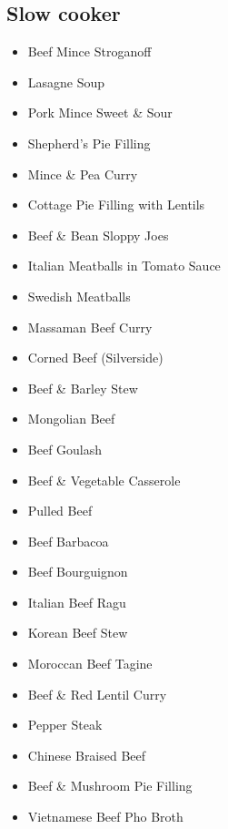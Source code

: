 \subsection*{Slow cooker}

\begin{itemize}
  \item \todo Beef Mince Stroganoff
  \item \todo Lasagne Soup
  \item \todo Pork Mince Sweet \& Sour
  \item \todo Shepherd's Pie Filling
  \item \todo Mince \& Pea Curry 
  \item \todo Cottage Pie Filling with Lentils
  \item \todo Beef \& Bean Sloppy Joes
  \item \todo Italian Meatballs in Tomato Sauce
  \item \todo Swedish Meatballs 
\end{itemize}

\begin{itemize}
  \item \todo Massaman Beef Curry
  \item \todo Corned Beef (Silverside) 
  \item \todo Beef \& Barley Stew
  \item \todo Mongolian Beef
  \item \todo Beef Goulash
  \item \todo Beef \& Vegetable Casserole
  \item \todo Pulled Beef 
  \item \todo Beef Barbacoa 
  \item \todo Beef Bourguignon
  \item \todo Italian Beef Ragu 
  \item \todo Korean Beef Stew
  \item \todo Moroccan Beef Tagine 
  \item \todo Beef \& Red Lentil Curry
  \item \todo Pepper Steak
  \item \todo Chinese Braised Beef 
  \item \todo Beef \& Mushroom Pie Filling
  \item \todo Vietnamese Beef Pho Broth
\end{itemize}

